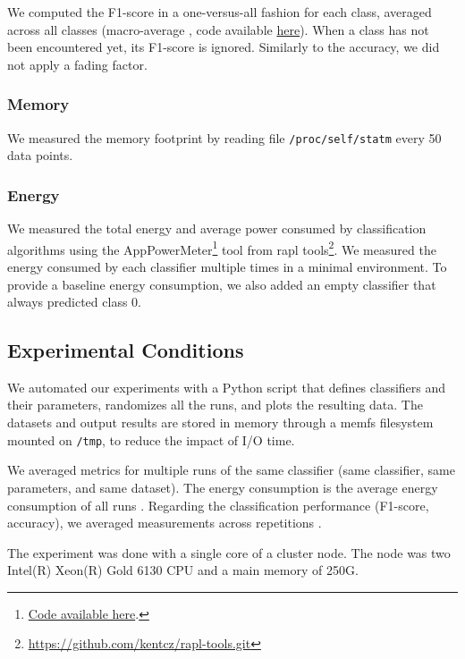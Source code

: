 We computed the
F1-score in a one-versus-all fashion for each class, averaged across all classes
(macro-average , code available \href{https://github.com/azazel7/paper-benchmark/blob/9adb1039c5a65a00a66d554f0e870d14d3fff7cb/main.cpp\#L82}{here}).  When a class has not been encountered yet, its F1-score is ignored.
Similarly to the accuracy, we did not apply a fading factor.

\subsubsection{Memory}
We measured the memory footprint by reading file
\texttt{/proc/self/statm} every 50 data points.


\subsubsection{Energy}
We measured the total energy and average power consumed by classification
algorithms using the
AppPowerMeter\footnote{\href{https://github.com/azazel7/paper-benchmark/blob/9adb1039c5a65a00a66d554f0e870d14d3fff7cb/makefile.py\#L122}{Code
available here}.} tool from rapl
tools\footnote{\url{https://github.com/kentcz/rapl-tools.git}}. We measured
the energy consumed by each classifier multiple times in a minimal
environment. To provide a baseline energy consumption, we also added an
empty classifier that always predicted class 0.

\subsection{Experimental Conditions}
We automated our experiments with a Python script that defines
classifiers and their parameters, randomizes all the runs, and plots the
resulting data. The datasets and output results are stored in memory
through a memfs filesystem mounted on \texttt{/tmp}, to reduce the impact of I/O time.

We averaged metrics for multiple runs of the same
classifier (same classifier, same parameters, and
same dataset). The energy
consumption is the average energy consumption of all runs . Regarding the
classification performance (F1-score, accuracy), we averaged measurements
across repetitions .

The experiment was done  with a single core of a
cluster node. The node was two Intel(R) Xeon(R)
Gold 6130 CPU and a main memory of 250G.

